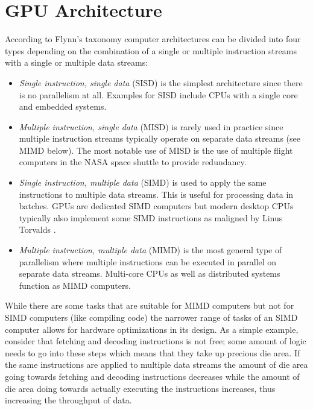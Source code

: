 \section{GPU Architecture}
According to Flynn's taxonomy\cite{flynntax} computer architectures can be divided into
four types depending on the combination of a single or multiple instruction streams
with a single or multiple data streams:
\begin{itemize}
	\item{\textit{Single instruction, single data} (SISD)}
		is the simplest architecture since there is no parallelism at all.
		Examples for SISD include CPUs with a single core and embedded systems.
	\item{\textit{Multiple instruction, single data} (MISD)}
		is rarely used in practice since multiple instruction streams typically operate on separate data streams (see MIMD below).
		The most notable use of MISD is the use of multiple flight computers in the NASA space shuttle to provide redundancy.
	\item{\textit{Single instruction, multiple data} (SIMD)}
		is used to apply the same instructions to multiple data streams.
		This is useful for processing data in batches.
		GPUs are dedicated SIMD computers but modern desktop CPUs typically also
		implement some SIMD instructions as maligned by Linus Torvalds \cite{axv512}.
	\item{\textit{Multiple instruction, multiple data} (MIMD)}
		is the most general type of parallelism where multiple instructions can be executed
		in parallel on separate data streams.
		Multi-core CPUs as well as distributed systems function as MIMD computers.
\end{itemize}
While there are some tasks that are suitable for MIMD computers but not for SIMD computers (like compiling code)
the narrower range of tasks of an SIMD computer allows for hardware optimizations in its design.
As a simple example, consider that fetching and decoding instructions is not free;
some amount of logic needs to go into these steps which means that they take up precious die area.
If the same instructions are applied to multiple data streams
the amount of die area going towards fetching and decoding instructions decreases
while the amount of die area doing towards actually executing the instructions increases, thus increasing the throughput of data.

